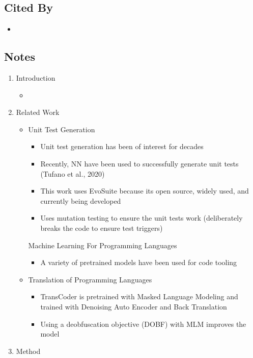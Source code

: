 \documentclass{article}
\begin{document}
\subsection*{Cited By}
\begin{itemize}
	\item
\end{itemize}

\subsection*{Notes}

\begin{enumerate}
	\item Introduction
	\begin{itemize}
		\item 
	\end{itemize}
	\item Related Work
	\begin{itemize}
		\item Unit Test Generation
		\begin{itemize}
			\item Unit test generation has been of interest for decades
			\item Recently, NN have been used to successfully generate unit tests (Tufano et al., 2020)
			\item This work uses EvoSuite because its open source, widely used, and currently being developed
			\item Uses mutation testing to ensure the unit tests work (deliberately breaks the code to ensure test triggers)
		\end{itemize}
		Machine Learning For Programming Languages
		\begin{itemize}
			\item A variety of pretrained models have been used for code tooling
		\end{itemize}
		\item Translation of Programming Languages
		\begin{itemize}
			\item TransCoder is pretrained with Masked Language Modeling and trained with Denoising Auto Encoder and Back Translation
			\item Using a deobfuscation objective (DOBF) with MLM improves the model
		\end{itemize}
	\end{itemize}
	\item Method
	\begin{enumerate}

\end{enumerate}
\end{enumerate}
\end{document}

